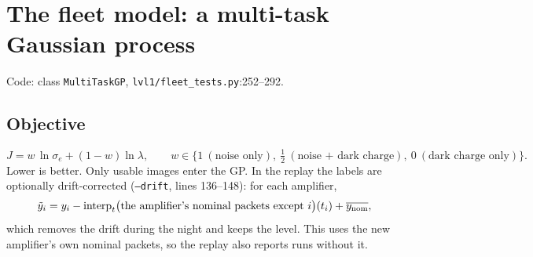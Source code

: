 \documentclass[10pt,a4paper]{article}
\newcommand{\code}[1]{\texttt{\small #1}}
\begin{document}
\section{The fleet model: a multi-task Gaussian process}\label{sec:fleet}

Code: class \code{MultiTaskGP}, \code{lvl1/fleet\_tests.py}:252--292.

\subsection{Objective}\label{sec:objective}
\begin{equation}
J=w\,\ln\sigma_e+(1-w)\ln\lambda,\qquad w\in\{1\ (\text{noise only}),\ \tfrac12\ (\text{noise + dark charge}),\ 0\ (\text{dark charge only})\}.
\end{equation}
Lower is better. Only usable images enter the GP. In the replay the labels are optionally drift-corrected (\code{--drift},
lines 136--148): for each amplifier,
\begin{equation}
\tilde y_i=y_i-\mathrm{interp}_t\big(\text{the amplifier's nominal packets except }i\big)(t_i)+\overline{y_{\rm nom}},
\end{equation}
which removes the drift during the night and keeps the level. This uses the new amplifier's own nominal packets, so the
replay also reports runs without it.
\end{document}
